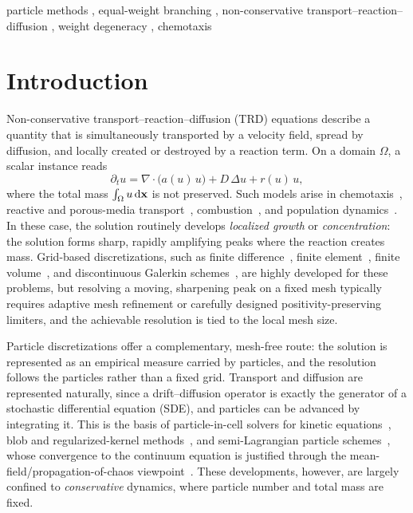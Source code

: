 \documentclass[a4paper,fleqn]{cas-sc}
\theoremstyle{definition}
\theoremstyle{remark}
\begin{document}
\begin{keywords}
particle methods \sep
equal-weight branching \sep
non-conservative transport--reaction--diffusion \sep
weight degeneracy \sep
chemotaxis
\end{keywords}

\maketitle

\section{Introduction}
Non-conservative transport--reaction--diffusion (TRD) equations describe a quantity that is simultaneously
transported by a velocity field, spread by diffusion, and locally created or destroyed by a reaction term.
On a domain $\Omega$, a scalar instance reads
\begin{equation}\label{equ:intro_trd}
\partial_t u = \nabla\!\cdot\!\big(a(u)\,u\big) + D\,\Delta u + r(u)\,u,
\end{equation}
where the total mass $\int_\Omega u\,\mathrm{d}\mathbf{x}$ is not preserved.
Such models arise in chemotaxis~\cite{keller1970initiation,patlak1953random}, reactive and porous-media transport~\cite{vazquez2006porous},
combustion~\cite{fisher1937wave,williams2018combustion}, and population dynamics~\cite{hundsdorfer2013numerical}. In these case, the solution routinely develops \emph{localized growth} or \emph{concentration}: the solution forms sharp, rapidly amplifying peaks where the
reaction creates mass. Grid-based discretizations, such as  finite difference~\cite{hoff1978stability}, finite
element~\cite{codina1998comparison}, finite volume~\cite{filbet2006finite,chertock2008second}, and
discontinuous Galerkin schemes~\cite{ayuso2009discontinuous,xia2009application},  are highly developed for
these problems, but resolving a moving, sharpening peak on a fixed mesh typically requires adaptive mesh
refinement or carefully designed positivity-preserving limiters, and the achievable resolution is tied to the
local mesh size.

Particle discretizations offer a complementary, mesh-free route: the solution is represented as an empirical
measure carried by particles, and the resolution follows the particles rather than a fixed grid. Transport and
diffusion are represented naturally, since a drift--diffusion operator is exactly the generator of a stochastic
differential equation (SDE), and particles can be advanced by integrating it. This is the basis of
particle-in-cell solvers for kinetic equations~\cite{birdsall2018plasma,hockney2021computer}, blob and
regularized-kernel methods~\cite{craig2016blob,carrillo2019blob,huang2017error}, and semi-Lagrangian particle
schemes~\cite{qiu2010conservative,qiu2011conservative,qiu2011positivity}, whose convergence to the continuum
equation is justified through the mean-field/propagation-of-chaos
viewpoint~\cite{fournier2004microscopic,hauray2009wasserstein,chaintron2021propagation}. These developments,
however, are largely confined to \emph{conservative} dynamics, where particle number and total mass are fixed.
\end{document}
